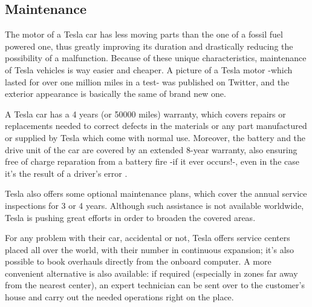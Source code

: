 \subsection{Maintenance}

The motor of a Tesla car has less moving parts than the one of a fossil fuel powered one, thus greatly improving its duration and drastically reducing the possibility of a malfunction. Because of these unique characteristics, maintenance of Tesla vehicles is way easier and cheaper. A picture of a Tesla motor -which lasted for over one million miles in a test- was published on Twitter, and the exterior appearance is basically the same of brand new one\cite{tesla1mMiles}.

A Tesla car has a 4 years (or 50000 miles) warranty, which covers repairs or replacements needed to correct defects in the materials or any part manufactured or supplied by Tesla which come with normal use. Moreover, the battery and the drive unit of the car are covered by an extended 8-year warranty, also ensuring free of charge reparation from a battery fire -if it ever occurs!-, even in the case it's the result of a driver's error \cite{teslaWarranty}. 

Tesla also offers some optional maintenance plans, which cover the annual service inspections for 3 or 4 years. Although such assistance is not available worldwide, Tesla is pushing great efforts in order to broaden the covered areas. 

For any problem with their car, accidental or not, Tesla offers service centers placed all over the world, with their number in continuous expansion; it's also possible to book overhauls directly from the onboard computer. A more convenient alternative is also available: if required (especially in zones far away from the nearest center), an expert technician can be sent over to the customer's house and carry out the needed operations right on the place.